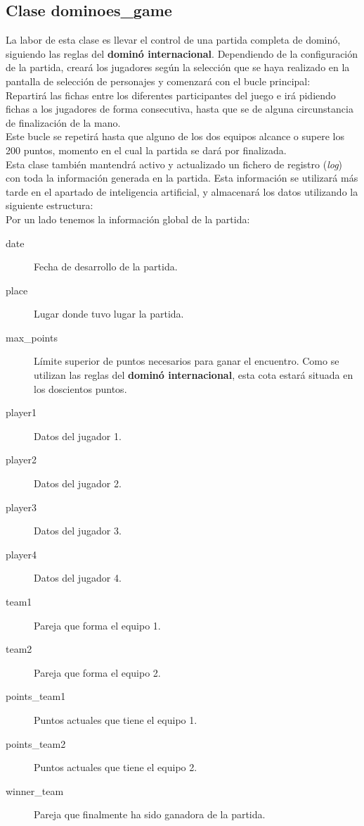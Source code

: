\subsection{Clase dominoes\_game}

La labor de esta clase es llevar el control de una partida completa de dominó, siguiendo las reglas del \textbf{dominó
internacional}. Dependiendo de la configuración de la partida, creará los jugadores según la selección que se haya
realizado en la pantalla de selección de personajes y comenzará con el bucle principal: \\

Repartirá las fichas entre los diferentes participantes del juego e irá pidiendo fichas a los jugadores de forma
consecutiva, hasta que se de alguna circunstancia de finalización de la mano. \\

Este bucle se repetirá hasta que alguno de los dos equipos alcance o supere los 200 puntos, momento en el cual la partida
se dará por finalizada. \\

Esta clase también mantendrá activo y actualizado un fichero de registro (\emph{log}) con toda la información generada en la partida. Esta
información se utilizará más tarde en el apartado de inteligencia artificial, y almacenará los datos utilizando
la siguiente estructura: \\

Por un lado tenemos la información global de la partida: 

\begin{description}
    \item[date] Fecha de desarrollo de la partida.
    \item[place] Lugar donde tuvo lugar la partida.
    \item[max\_points] Límite superior de puntos necesarios para ganar el encuentro. Como se utilizan las reglas del
        \textbf{dominó internacional}, esta cota estará situada en los doscientos puntos.
    \item[player1] Datos del jugador 1.
    \item[player2] Datos del jugador 2.
    \item[player3] Datos del jugador 3.
    \item[player4] Datos del jugador 4.
    \item[team1] Pareja que forma el equipo 1.
    \item[team2] Pareja que forma el equipo 2.
    \item[points\_team1] Puntos actuales que tiene el equipo 1.
    \item[points\_team2] Puntos actuales que tiene el equipo 2.
    \item[winner\_team] Pareja que finalmente ha sido ganadora de la partida.
\end{description}

